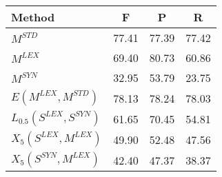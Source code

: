 \begin{table}[]
\centering
\setlength\tabcolsep{2.75pt}
\begin{tabular}{@{\makebox[1.50em][l]{\rownumber\space}}lccc@{}}
\toprule
\textbf{Method} & \textbf{F} & \textbf{P} & \textbf{R}\\ \midrule
$M^{STD}$                    & 77.41 & 77.39 & 77.42  \\ 
$M^{LEX}$                    & 69.40 & 80.73 & 60.86 \\
\gdef\rownumber{\circlednumber{\stepcounter{magicrownumbers}\arabic{magicrownumbers}}}%
$M^{SYN}$                    & 32.95 & 53.79 & 23.75 \\ 
\midrule
$E(M^{LEX}, M^{STD})$        & 78.13 & 78.24 & 78.03 \\
$L_{0.5}(S^{LEX}, S^{SYN})$  & 61.65 & 70.45 & 54.81 \\
$X_5(S^{LEX}, M^{LEX})$  & 49.90           & 52.48            & 47.56           \\ 
%
$X_5(S^{SYN}, M^{LEX})$ &  42.40          & 47.37            & 38.37          \\ 

\end{tabular}
\end{table}
